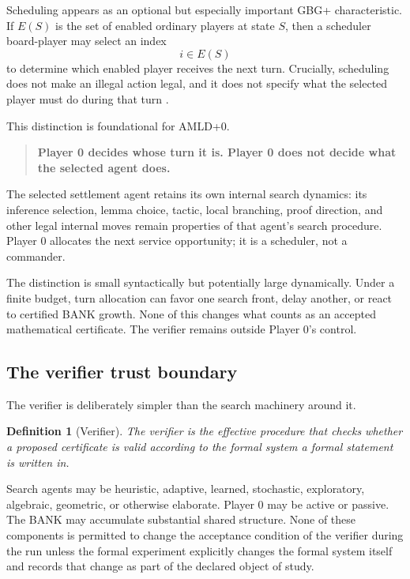 \documentclass[11pt]{article}
\newtheorem{definition}{Definition}[section]
\begin{document}
Scheduling appears as an optional but especially important GBG+ characteristic. If $E(S)$ is the set of enabled ordinary players at state $S$, then a scheduler board-player may select an index
\[
i\in E(S)
\]
to determine which enabled player receives the next turn. Crucially, scheduling does not make an illegal action legal, and it does not specify what the selected player must do during that turn \cite{gbgplus}.

This distinction is foundational for AMLD+0.

\begin{quote}
\textbf{Player 0 decides whose turn it is. Player 0 does not decide what the selected agent does.}
\end{quote}

The selected settlement agent retains its own internal search dynamics: its inference selection, lemma choice, tactic, local branching, proof direction, and other legal internal moves remain properties of that agent's search procedure. Player 0 allocates the next service opportunity; it is a scheduler, not a commander.

The distinction is small syntactically but potentially large dynamically. Under a finite budget, turn allocation can favor one search front, delay another, or react to certified BANK growth. None of this changes what counts as an accepted mathematical certificate. The verifier remains outside Player 0's control.

\subsection{The verifier trust boundary}

The verifier is deliberately simpler than the search machinery around it.

\begin{definition}[Verifier]
The verifier is the effective procedure that checks whether a proposed certificate is valid according to the formal system a formal statement is written in.
\end{definition}

Search agents may be heuristic, adaptive, learned, stochastic, exploratory, algebraic, geometric, or otherwise elaborate. Player 0 may be active or passive. The BANK may accumulate substantial shared structure. None of these components is permitted to change the acceptance condition of the verifier during the run unless the formal experiment explicitly changes the formal system itself and records that change as part of the declared object of study.
\end{document}
